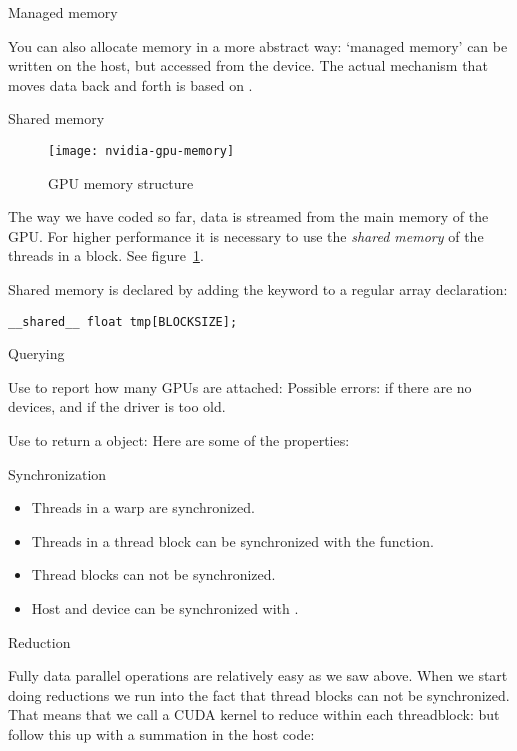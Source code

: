 {Managed memory}

You can also allocate memory in a more abstract way:
`managed memory' can be written on the host,
but accessed from the device.
The actual mechanism that moves data back and forth
is based on .

 {Shared memory}

\begin{figure}[ht]
  \texttt{[image: nvidia-gpu-memory]}  
  \caption{GPU memory structure}
  \label{fig:gpu-memory}
\end{figure}

The way we have coded so far, data is streamed from the
main memory of the \ac{GPU}.
For higher performance it is necessary to use the
\emph{shared memory}
of the threads in a block.
See figure~\ref{fig:gpu-memory}.

Shared memory is declared by adding the keyword
 to a regular array declaration:
\begin{lstlisting}
__shared__ float tmp[BLOCKSIZE];
\end{lstlisting}

 {Querying}

Use  to report how many \acp{GPU} are attached:
Possible errors:  if there are no devices,
and  if the driver is too old.

Use 
to return a  object:
Here are some of the properties:

 {Synchronization}

\begin{itemize}
\item Threads in a warp are synchronized.
\item Threads in a thread block can be synchronized
  with the  function.
\item Thread blocks can not be synchronized.
\item Host and device can be synchronized
  with .
\end{itemize}

 {Reduction}

Fully data parallel operations are relatively easy
as we saw above.
When we start doing reductions we run into the fact that
thread blocks can not be synchronized.
That means that we call a \ac{CUDA} kernel to reduce
within each threadblock:
but follow this up with a summation in the host code:

